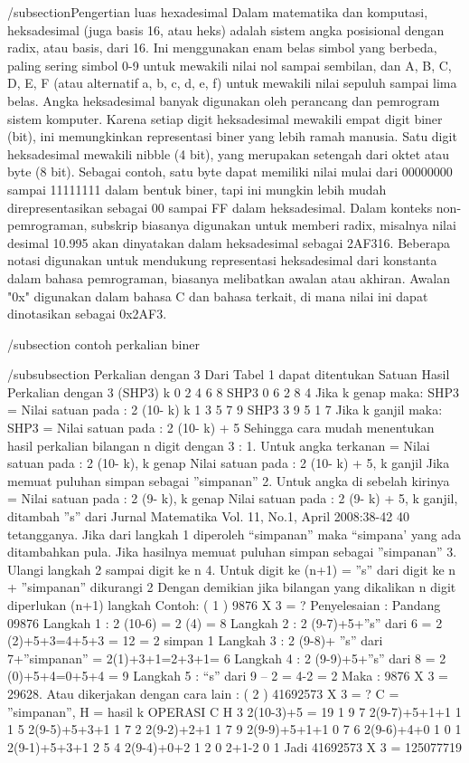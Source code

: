 /subsection{Pengertian luas hexadesimal}
Dalam matematika dan komputasi, heksadesimal (juga basis 16, atau heks) adalah sistem angka posisional dengan radix, atau basis, dari 16. Ini menggunakan enam belas simbol yang berbeda, paling sering simbol 0-9 untuk mewakili nilai nol sampai sembilan, dan A, B, C, D, E, F (atau alternatif a, b, c, d, e, f) untuk mewakili nilai sepuluh sampai lima belas.
Angka heksadesimal banyak digunakan oleh perancang dan pemrogram sistem komputer. Karena setiap digit heksadesimal mewakili empat digit biner (bit), ini memungkinkan representasi biner yang lebih ramah manusia. Satu digit heksadesimal mewakili nibble (4 bit), yang merupakan setengah dari oktet atau byte (8 bit). Sebagai contoh, satu byte dapat memiliki nilai mulai dari 00000000 sampai 11111111 dalam bentuk biner, tapi ini mungkin lebih mudah direpresentasikan sebagai 00 sampai FF dalam heksadesimal.
Dalam konteks non-pemrograman, subskrip biasanya digunakan untuk memberi radix, misalnya nilai desimal 10.995 akan dinyatakan dalam heksadesimal sebagai 2AF316. Beberapa notasi digunakan untuk mendukung representasi heksadesimal dari konstanta dalam bahasa pemrograman, biasanya melibatkan awalan atau akhiran. Awalan "0x" digunakan dalam bahasa C dan bahasa terkait, di mana nilai ini dapat dinotasikan sebagai 0x2AF3.

/subsection {contoh perkalian biner}

/subsubsection {Perkalian dengan 3}
Dari Tabel 1 dapat ditentukan
Satuan Hasil Perkalian dengan 3 (SHP3)
k 0 2 4 6 8
SHP3 0 6 2 8 4
Jika k genap maka:
SHP3 = Nilai satuan pada : 2 (10- k)
k 1 3 5 7 9
SHP3 3 9 5 1 7
Jika k ganjil maka:
SHP3 = Nilai satuan pada : 2 (10- k) + 5
Sehingga cara mudah menentukan hasil
perkalian bilangan n digit dengan 3 :
1. Untuk angka terkanan =
Nilai satuan pada : 2 (10- k), k genap
Nilai satuan pada : 2 (10- k) + 5,
k ganjil
Jika memuat puluhan simpan sebagai
”simpanan”
2. Untuk angka di sebelah kirinya =
Nilai satuan pada : 2 (9- k), k genap
Nilai satuan pada : 2 (9- k) + 5,
k ganjil, ditambah ”s” dari
Jurnal Matematika Vol. 11, No.1, April 2008:38-42
40
tetangganya.
Jika dari langkah 1 diperoleh
“simpanan” maka “simpana’ yang ada
ditambahkan pula.
Jika hasilnya memuat puluhan simpan
sebagai ”simpanan”
3. Ulangi langkah 2 sampai digit ke n
4. Untuk digit ke (n+1) =
”s” dari digit ke n + ”simpanan”
dikurangi 2
Dengan demikian jika bilangan yang
dikalikan n digit diperlukan (n+1) langkah
Contoh:
( 1 ) 9876 X 3 = ?
Penyelesaian : Pandang 09876
Langkah 1 : 2 (10-6) = 2 (4) = 8
Langkah 2 : 2 (9-7)+5+”s” dari 6
= 2 (2)+5+3=4+5+3 = 12
= 2 simpan 1
Langkah 3 : 2 (9-8)+
”s” dari 7+”simpanan”
= 2(1)+3+1=2+3+1= 6
Langkah 4 : 2 (9-9)+5+”s” dari 8
= 2 (0)+5+4=0+5+4 = 9
Langkah 5 : “s” dari 9 – 2 = 4-2 = 2
Maka : 9876 X 3 = 29628.
Atau dikerjakan dengan cara lain :
( 2 ) 41692573 X 3 = ?
C = ”simpanan”, H = hasil
k OPERASI C H
3 2(10-3)+5 = 19 1 9
7 2(9-7)+5+1+1 1 1
5 2(9-5)+5+3+1 1 7
2 2(9-2)+2+1 1 7
9 2(9-9)+5+1+1 0 7
6 2(9-6)+4+0 1 0
1 2(9-1)+5+3+1 2 5
4 2(9-4)+0+2 1 2
0 2+1-2 0 1
Jadi 41692573 X 3 = 125077719

